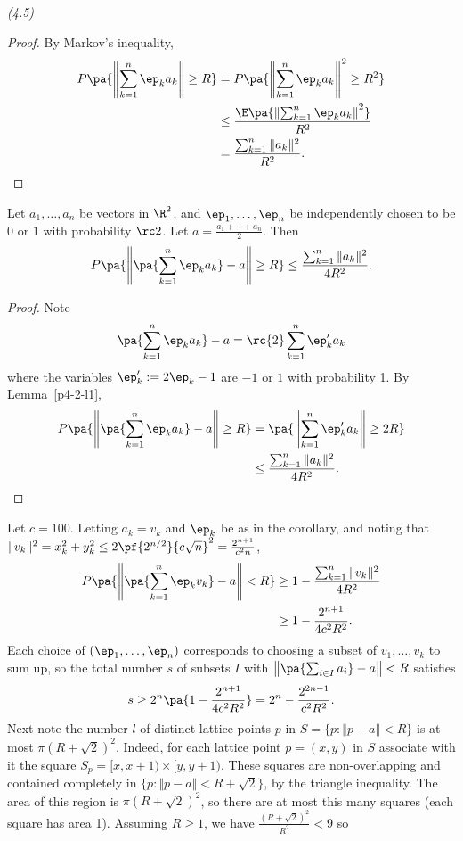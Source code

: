 \begin{problem}{\it (4.5)}
\begin{proof}
By Markov's inequality,
\begin{align*}P\pa{\left\Vert\sum_{k=1}^n \ep_ka_k\right\Vert\ge R}&=
P\pa{\left\Vert\sum_{k=1}^n \ep_ka_k\right\Vert^2\ge R^2}\\
&\le \frac{\E\pa{\left\Vert\sum_{k=1}^n \ep_ka_k\right\Vert^2}}{R^2}\\
&=\frac{\sum_{k=1}^n \Vert a_k\Vert^2}{R^2}.
\end{align*}
\end{proof}
\begin{cor}\label{p4-2-c2}
Let $a_1,\ldots, a_n$ be vectors in $\R^2$, and $\ep_1,\ldots, \ep_n$ be independently chosen to be $0$ or $1$ with probability $\rc2$. 
Let $a=\frac{a_1+\cdots +a_n}{2}$. 
Then
\[
P\pa{\left\Vert\pa{\sum_{k=1}^n \ep_ka_k}-a\right\Vert\ge R}\le\frac{\sum_{k=1}^n \Vert a_k\Vert^2}{4R^2}. 
\]
\end{cor}
\begin{proof}
Note
\[\pa{\sum_{k=1}^n \ep_ka_k}-a=\rc{2}\sum_{k=1}^n\ep_k'a_k\]
where the variables $\ep_k':=2\ep_k-1$ are $-1$ or $1$ with probability 1. By Lemma~\ref{p4-2-l1}, 
\begin{align*}
P\pa{\left\Vert\pa{\sum_{k=1}^n \ep_ka_k}-a\right\Vert\ge R}
&=\pa{\left\Vert\sum_{k=1}^n\ep_k'a_k\right\Vert\ge 2R}\\
&\le \frac{\sum_{k=1}^n \Vert a_k\Vert^2}{4R^2}.
\end{align*}
\end{proof}
Let $c=100$. Letting $a_k=v_k$ and $\ep_k$ be as in the corollary, and noting that $\Vert v_k\Vert^2=x_k^2+y_k^2\le 2\pf{2^{n/2}}{c\sqrt n}^2=\frac{2^{n+1}}{c^2n}$, 
\begin{align*}
P\pa{\left\Vert\pa{\sum_{k=1}^n \ep_kv_k}-a\right\Vert< R}
&\ge 1-\frac{\sum_{k=1}^n \Vert v_k\Vert^2}{4R^2}\\
&\ge 1-\frac{2^{n+1}}{4c^2R^2}.
\end{align*}
Each choice of $(\ep_1,\ldots, \ep_n)$ corresponds to choosing a subset of $v_1,\ldots, v_k$ to sum up, so the total number $s$ of subsets $I$ with $\left\Vert\pa{\sum_{i\in I} a_i}-a\right\Vert<R$ satisfies
\begin{equation}\label{p4-2-1}
s\geq 2^n\pa{1-\frac{2^{n+1}}{4c^2R^2}}=2^n-\frac{2^{2n-1}}{c^2 R^2}.
\end{equation}
Next note the number $l$ of distinct lattice points $p$ in $S=\{p:\Vert p-a\Vert<R\}$ is at most $\pi(R+\sqrt 2)^2$. Indeed, for each lattice point $p=(x,y)$ in $S$ associate with it the square $S_p=[x,x+1)\times [y,y+1)$. These squares are non-overlapping and contained completely in $\{p:\Vert p-a\Vert<R+\sqrt 2\}$, by the triangle inequality. The area of this region is $\pi(R+\sqrt 2)^2$, so there are at most this many squares (each square has area 1). Assuming $R\ge 1$, we have $\frac{(R+\sqrt 2)^2}{R^2}<9$ so

\end{problem}
